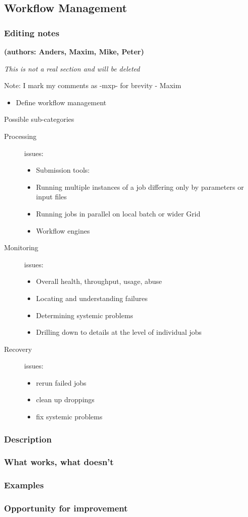 \subsection{Workflow Management}

\subsubsection{Editing notes}

\textbf{(authors: Anders, Maxim, Mike, Peter)}

\textit{This is not a real section and will be deleted}

Note: I mark my comments as -mxp- for brevity - Maxim

\begin{itemize}
\item Define workflow management
\end{itemize}
Possible sub-categories
\begin{description}
\item[Processing] issues:

  \begin{itemize}
  \item Submission tools:
  \item Running multiple instances of a job differing only by parameters or input files
  \item Running jobs in parallel on local batch or wider Grid
  \item Workflow engines
  \end{itemize}
\item[Monitoring] issues:
  \begin{itemize}
  \item Overall health, throughput, usage, abuse
  \item Locating and understanding failures
  \item Determining systemic problems
  \item Drilling down to details at the level of individual jobs
  \end{itemize}
\item[Recovery] issues:
  \begin{itemize}
  \item rerun failed jobs
  \item clean up droppings
  \item fix systemic problems
  \end{itemize}
\end{description}

\subsubsection{Description}
\subsubsection{What works, what doesn't}
\subsubsection{Examples}
\subsubsection{Opportunity for improvement}
